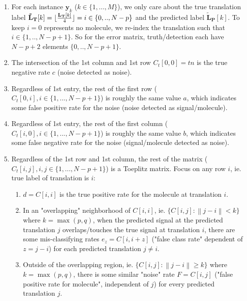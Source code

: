 \documentclass[11pt]{article}
\DeclarePairedDelimiter{\floor}{\lfloor}{\rfloor}
\newcommand{\by}{\boldsymbol{y}}
\newcommand{\norm}[1]{\left\lVert#1\right\rVert}
\begin{document}
        \begin{enumerate}
            \item For each instance $\by_k$ ($k \in \{1,...,M\}$), we only care about the true translation label $\mathbf{\tilde{L}_T}[k] = \floor{\frac{\mathbf{L_T}[k]}{4}} = i \in {\{0,..,N-p\}}$ and the predicted label $\mathbf{\tilde{L}_P}[k]$. To keep $i=0$ represents no molecule, we re-index the translation such that $i \in {\{1,..,N-p+1\}}$. So for the error matrix, truth/detection each have $N-p+2$ elements ${\{0,..,N-p+1\}}$.
            
            \item The intersection of the 1st column and 1st row $C_{t}[0,0]=tn$ is the true negative rate $c$ (noise detected as noise). 
                \item Regardless of 1st entry, the rest of the first row ($C_{t}[0,i], i \in \{1,...,N-p+1\}$) is roughly the same value $a$, which indicates some false positive rate for the noise (noise detected as signal/molecule).
                \item Regardless of 1st entry, the rest of the first column ($C_{t}[i,0], i \in \{1,...,N-p+1\}$) is roughly the same value $b$, which indicates some false negative rate for the noise (signal/molecule detected as noise).
                \item Regardless of the 1st row and 1st column, the rest of the matrix ($C_{t}[i,j], i,j \in \{1,...,N-p+1\}$) is a Toeplitz matrix. Focus on any row $i$, ie. true label of translation is $i$: 
                \begin{enumerate}
                    \item $d=C[i,i]$ is the true positive rate for the molecule at translation $i$. 
                    \item In an "overlapping" neighborhood of $C[i,i]$, ie. $\{C[i,j]: \norm {j-i } < k\}$ where $k=\max{(p,q)}$, when the predicted signal at the predicted translation $j$ overlaps/touches the true signal at translation $i$, there are some mis-classifying rates $e_{z}=C[i,i+z]$ ("false class rate" dependent of $z=j-i$) for each predicted translation $j \neq i$.
                    \item Outside of the overlapping region, ie. $\{C[i,j]: \norm {j-i } \ge k\}$ where $k=\max{(p,q)}$, there is some similar "noise" rate $F=C[i,j]$ ("false positive rate for molecule", independent of $j$) for every predicted translation $j$.
                \end{enumerate}
            

\end{enumerate}
\end{document}
